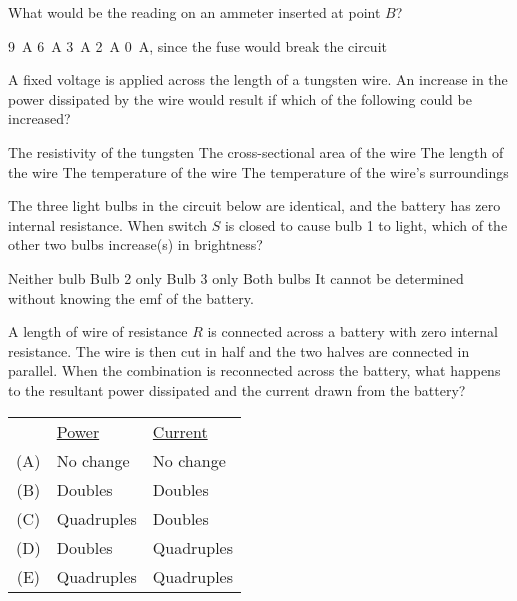 \documentclass[12pt]{../oss-classkick-exam}
\begin{document}
\begin{questions}
  \question What would be the reading on an ammeter inserted at point $B$?
  \label{rcirc2}
  \begin{choices}
    \choice\SI{9}{\ampere}
    \choice\SI{6}{\ampere}
    \choice\SI{3}{\ampere}
    \choice\SI{2}{\ampere}
    \choice\SI{0}{\ampere}, since the fuse would break the circuit
  \end{choices}
  
  \uplevel{\rule{\linewidth}{.5pt}}

  \question A fixed voltage is applied across the length of a tungsten wire. An
  increase in the power dissipated by the wire would result if which of the
  following could be increased?
  \begin{choices}
    \choice The resistivity of the tungsten
    \choice The cross-sectional area of the wire
    \choice The length of the wire
    \choice The temperature of the wire
    \choice The temperature of the wire’s surroundings
  \end{choices}
  

  \question The three light bulbs in the circuit below are identical, and the
  battery has zero internal resistance. When switch $S$ is closed to cause
  bulb 1 to light, which of the other two bulbs increase(s) in brightness?
  \begin{choices}
    \choice Neither bulb
    \choice Bulb 2 only
    \choice Bulb 3 only
    \choice Both bulbs
    \choice It cannot be determined without knowing the emf of the battery.
  \end{choices}

  \uplevel{ \rule{\linewidth}{.5pt}}
  
  \question A length of wire of resistance $R$ is connected across a battery
  with zero internal resistance. The wire is then cut in half and the two
  halves are connected in parallel. When the combination is reconnected across
  the battery, what happens to the resultant power dissipated and the current
  drawn from the battery?

  \begin{tabular}{cll}
    & \underline{Power} & \underline{Current}\\
    (A) & No change  & No change \\
    (B) & Doubles    & Doubles   \\
    (C) & Quadruples & Doubles   \\
    (D) & Doubles    & Quadruples\\
    (E) & Quadruples & Quadruples
  \end{tabular}


\end{questions}
\end{document}
